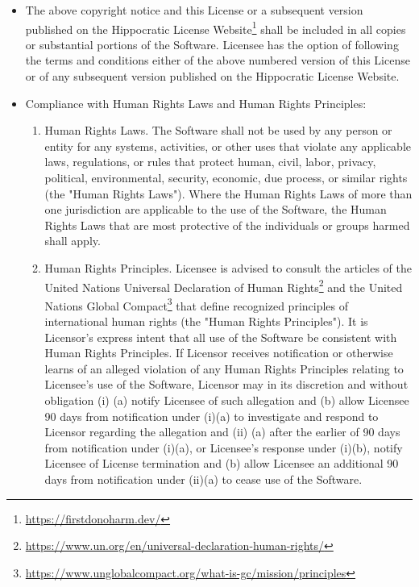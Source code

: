 \documentclass[krantzl]{krantz}
\newcommand{\hreffoot}[2]{{#1}\footnote{\href{#2}{#2}}}
\begin{document}
\begin{itemize}

\item 

The above copyright notice and this License or a subsequent version published
    on the \hreffoot{Hippocratic License Website}{https://firstdonoharm.dev/} shall be
    included in all copies or substantial portions of the Software. Licensee has
    the option of following the terms and conditions either of the above
    numbered version of this License or of any subsequent version published on
    the Hippocratic License Website.



\item 

Compliance with Human Rights Laws and Human Rights Principles:

\begin{enumerate}

\item 

Human Rights Laws. The Software shall not be used by any person or
    entity for any systems, activities, or other uses that violate any
    applicable laws, regulations, or rules that protect human, civil, labor,
    privacy, political, environmental, security, economic, due process, or
    similar rights (the "Human Rights Laws"). Where the Human Rights Laws of
    more than one jurisdiction are applicable to the use of the Software,
    the Human Rights Laws that are most protective of the individuals or
    groups harmed shall apply.



\item 

Human Rights Principles. Licensee is advised to consult the articles of
    the \hreffoot{United Nations Universal Declaration of Human
    Rights}{https://www.un.org/en/universal-declaration-human-rights/} and
    the \hreffoot{United Nations Global
    Compact}{https://www.unglobalcompact.org/what-is-gc/mission/principles}
    that define recognized principles of international human rights (the
    "Human Rights Principles"). It is Licensor's express intent that all use
    of the Software be consistent with Human Rights Principles. If Licensor
    receives notification or otherwise learns of an alleged violation of any
    Human Rights Principles relating to Licensee's use of the Software,
    Licensor may in its discretion and without obligation (i) (a) notify
    Licensee of such allegation and (b) allow Licensee 90 days from
    notification under (i)(a) to investigate and respond to Licensor
    regarding the allegation and (ii) (a) after the earlier of 90 days from
    notification under (i)(a), or Licensee's response under (i)(b), notify
    Licensee of License termination and (b) allow Licensee an additional 90
    days from notification under (ii)(a) to cease use of the Software.




\end{enumerate}
\end{itemize}
\end{document}

